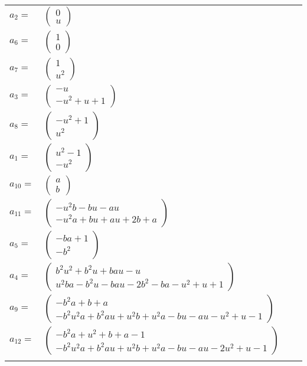 \documentclass[1p]{elsarticle_modified}
\theoremstyle{definition}
\begin{document}
\begin{tabular}{m{7pt} m{180pt} m{7pt} m{180pt} }
\flushright $a_{2}=$&$\begin{pmatrix}0\\u\end{pmatrix}$ \\
\flushright $a_{6}=$&$\begin{pmatrix}1\\0\end{pmatrix}$ \\
\flushright $a_{7}=$&$\begin{pmatrix}1\\u^2\end{pmatrix}$ \\
\flushright $a_{3}=$&$\begin{pmatrix}- u\\- u^2+u+1\end{pmatrix}$ \\
\flushright $a_{8}=$&$\begin{pmatrix}- u^2+1\\u^2\end{pmatrix}$ \\
\flushright $a_{1}=$&$\begin{pmatrix}u^2-1\\- u^2\end{pmatrix}$ \\
\flushright $a_{10}=$&$\begin{pmatrix}a\\b\end{pmatrix}$ \\
\flushright $a_{11}=$&$\begin{pmatrix}- u^2 b- b u- a u\\- u^2 a+b u+a u+2 b+a\end{pmatrix}$ \\
\flushright $a_{5}=$&$\begin{pmatrix}- b a+1\\- b^2\end{pmatrix}$ \\
\flushright $a_{4}=$&$\begin{pmatrix}b^2 u^2+b^2 u+b a u- u\\u^2 b a- b^2 u- b a u-2 b^2- b a- u^2+u+1\end{pmatrix}$ \\
\flushright $a_{9}=$&$\begin{pmatrix}- b^2 a+b+a\\- b^2 u^2 a+b^2 a u+u^2 b+u^2 a- b u- a u- u^2+u-1\end{pmatrix}$ \\
\flushright $a_{12}=$&$\begin{pmatrix}- b^2 a+u^2+b+a-1\\- b^2 u^2 a+b^2 a u+u^2 b+u^2 a- b u- a u-2 u^2+u-1\end{pmatrix}$\\&\end{tabular}
\end{document}
